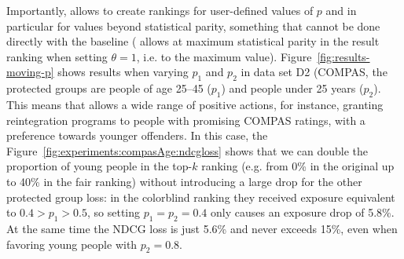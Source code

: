 Importantly, \algoFAIR allows to create rankings for user-defined values of $p$ and in particular for values beyond statistical parity, something that cannot be done directly with the baseline (\citet{zehlike2020matching} allows at maximum statistical parity in the result ranking when setting $\theta=1$, i.e. to the maximum value).
%
Figure~\ref{fig:results-moving-p} shows results when varying $p_1$ and $p_2$ in data set D2 (COMPAS, the protected groups are people of age 25--45 ($p_1$) and people under 25 years ($p_2$).
%
This means that \algoFAIR allows a wide range of positive actions, for instance, granting reintegration programs to people with promising COMPAS ratings, with a preference towards younger offenders.
%
In this case, the Figure~\ref{fig:experiments:compasAge:ndcgloss} shows that we can double the proportion of young people in the top-$k$ ranking (e.g. from 0\% in the original up to 40\% in the fair ranking) without introducing a large drop for the other protected group loss: in the colorblind ranking they received exposure equivalent to $0.4 > p_1 > 0.5$, so setting $p_1 = p_2 = 0.4$ only causes an exposure drop of 5.8\%.
%
At the same time the NDCG loss is just 5.6\% and never exceeds 15\%, even when favoring young people with $p_2=0.8$.
